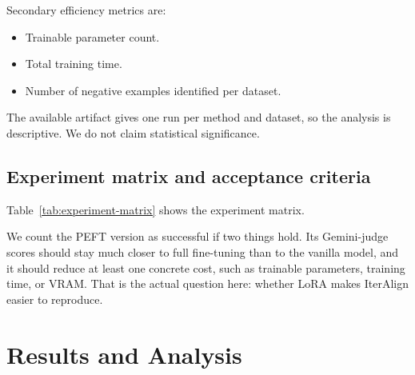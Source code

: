 \documentclass[11pt]{article}
\begin{document}
Secondary efficiency metrics are:
\begin{itemize}
  \item Trainable parameter count.
  \item Total training time.
  \item Number of negative examples identified per dataset.
\end{itemize}

The available artifact gives one run per method and dataset, so the analysis is descriptive. We do not claim statistical significance.

\subsection{Experiment matrix and acceptance criteria}
Table~\ref{tab:experiment-matrix} shows the experiment matrix.

\begin{table}[H]
\centering
\caption{Experiment matrix.}
\label{tab:experiment-matrix}
\end{table}

We count the PEFT version as successful if two things hold. Its Gemini-judge scores should stay much closer to full fine-tuning than to the vanilla model, and it should reduce at least one concrete cost, such as trainable parameters, training time, or VRAM. That is the actual question here: whether LoRA makes IterAlign easier to reproduce.

\section{Results and Analysis}
\label{sec:results}
\end{document}
